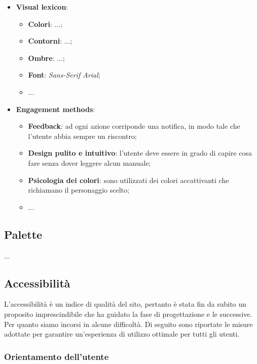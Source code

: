 \begin{itemize}
    \item \textbf{Visual lexicon}:
		\begin{itemize}
			\item \textbf{Colori}: ...;
			\item \textbf{Contorni}: ...;
			\item \textbf{Ombre}: ...;
			\item \textbf{Font}: \textit{Sans-Serif Arial};
            \item ...
		\end{itemize}
    
    \item \textbf{Engagement methods}:
		\begin{itemize}
			\item \textbf{Feedback}: ad ogni azione corriponde una notifica, in
				modo tale che l'utente abbia sempre un riscontro;

			\item \textbf{Design pulito e intuitivo}: l'utente deve essere in
				grado di capire cosa fare senza dover leggere alcun manuale;

			\item \textbf{Psicologia dei colori}: sono utilizzati dei colori
				accattivanti che richiamano il personaggio scelto;

            \item ...
		\end{itemize}
\end{itemize}

\subsection{Palette}

...

\subsection{Accessibilità}

L'accessibilità è un indice di qualità del sito, pertanto è stata fin da subito
un proposito imprescindibile che ha guidato la fase di progettazione e le
successive. Per quanto siamo incorsi in alcune difficoltà. Di seguito sono
riportate le misure adottate per garantire un'esperienza di utilizzo ottimale
per tutti gli utenti.

\subsubsection{Orientamento dell'utente}

